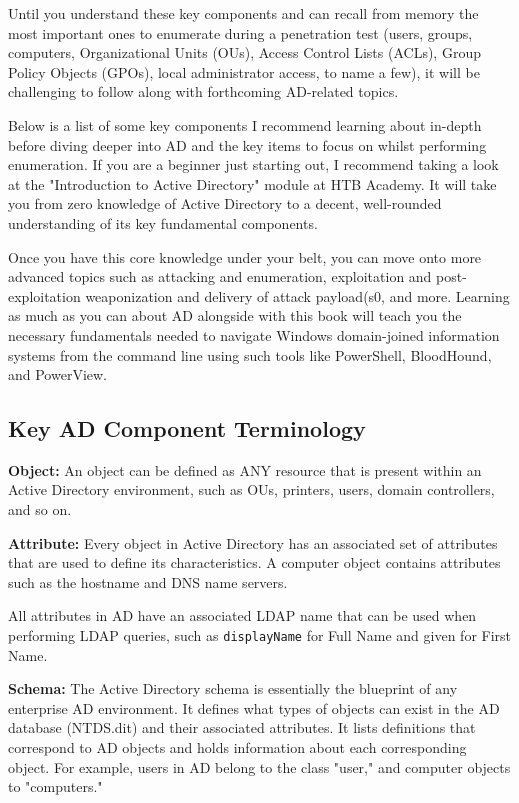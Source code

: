 Until you understand these key components and can recall from memory the most important ones to enumerate during a penetration test (users, groups, computers, Organizational Units (OUs), Access Control Lists (ACLs), Group Policy Objects (GPOs), local administrator access, to name a few), it will be challenging to follow along with forthcoming AD-related topics.

Below is a list of some key components I recommend learning about in-depth before diving deeper into AD and the key items to focus on whilst performing enumeration. If you are a beginner just starting out, I recommend taking a look at the "Introduction to Active Directory" module at HTB Academy. It will take you from zero knowledge of Active Directory to a decent, well-rounded understanding of its key fundamental components.

Once you have this core knowledge under your belt, you can move onto more advanced topics such as attacking and enumeration, exploitation and post-exploitation weaponization and delivery of attack payload(s0, and more. Learning as much as you can about AD alongside with this book will teach you the necessary fundamentals needed to navigate Windows domain-joined information systems from the command line using such tools like PowerShell, BloodHound, and PowerView.

\subsection{Key AD Component Terminology}
\textbf{Object:}
An object can be defined as ANY resource that is present within an Active Directory environment, such as OUs, printers, users, domain controllers, and so on.

\textbf{Attribute:}
Every object in Active Directory has an associated set of attributes that are used to define its characteristics. A computer object contains attributes such as the hostname and DNS name servers.

All attributes in AD have an associated LDAP name that can be used when performing LDAP queries, such as \texttt{displayName} for Full Name and given for First Name.

\textbf{Schema:}
The Active Directory schema is essentially the blueprint of any enterprise AD environment. It defines what types of objects can exist in the AD database (NTDS.dit) and their associated attributes. It lists definitions that correspond to AD objects and holds information about each corresponding object. For example, users in AD belong to the class "user," and computer objects to "computers."

